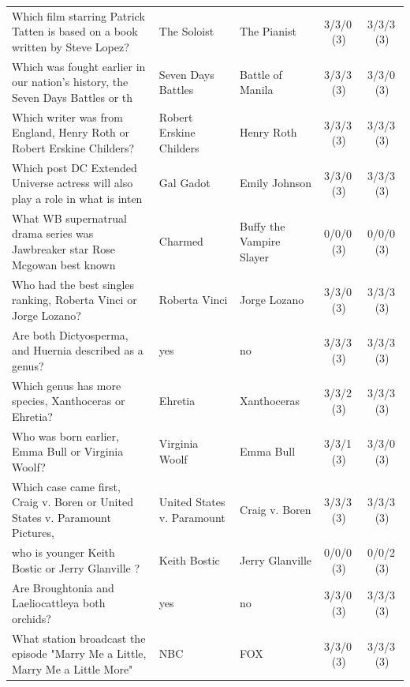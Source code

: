 \begin{longtable}{@{}p{6.6cm}p{2.9cm}p{2.9cm}cc@{}}
\rowcolor{neutralgray}
Which film starring Patrick Tatten is based on a book written by Steve Lopez? & The Soloist & The Pianist & 3/3/0\,\footnotesize(3) & 3/3/3\,\footnotesize(3) \\
Which was fought earlier in our nation's history, the Seven Days Battles or th & Seven Days Battles & Battle of Manila & 3/3/3\,\footnotesize(3) & 3/3/0\,\footnotesize(3) \\
\rowcolor{neutralgray}
Which writer was from England, Henry Roth or Robert Erskine Childers? & Robert Erskine Childers & Henry Roth & 3/3/3\,\footnotesize(3) & 3/3/3\,\footnotesize(3) \\
Which post DC Extended Universe actress will also play a role in what is inten & Gal Gadot & Emily Johnson & 3/3/0\,\footnotesize(3) & 3/3/3\,\footnotesize(3) \\
\rowcolor{neutralgray}
What WB supernatrual drama series was Jawbreaker star Rose Mcgowan best known  & Charmed & Buffy the Vampire Slayer & 0/0/0\,\footnotesize(3) & 0/0/0\,\footnotesize(3) \\
Who had the best singles ranking, Roberta Vinci or Jorge Lozano? & Roberta Vinci & Jorge Lozano & 3/3/0\,\footnotesize(3) & 3/3/3\,\footnotesize(3) \\
\rowcolor{neutralgray}
Are both Dictyosperma, and Huernia described as a genus? & yes & no & 3/3/3\,\footnotesize(3) & 3/3/3\,\footnotesize(3) \\
Which genus has more species, Xanthoceras or Ehretia? & Ehretia & Xanthoceras & 3/3/2\,\footnotesize(3) & 3/3/3\,\footnotesize(3) \\
\rowcolor{neutralgray}
Who was born earlier, Emma Bull or Virginia Woolf? & Virginia Woolf & Emma Bull & 3/3/1\,\footnotesize(3) & 3/3/0\,\footnotesize(3) \\
Which case came first, Craig v. Boren or United States v. Paramount Pictures,  & United States v. Paramount & Craig v. Boren & 3/3/3\,\footnotesize(3) & 3/3/3\,\footnotesize(3) \\
\rowcolor{neutralgray}
who is younger Keith Bostic or Jerry Glanville ? & Keith Bostic & Jerry Glanville & 0/0/0\,\footnotesize(3) & 0/0/2\,\footnotesize(3) \\
Are Broughtonia and Laeliocattleya both orchids? & yes & no & 3/3/0\,\footnotesize(3) & 3/3/3\,\footnotesize(3) \\
\rowcolor{neutralgray}
What station broadcast the episode "Marry Me a Little, Marry Me a Little More" & NBC & FOX & 3/3/0\,\footnotesize(3) & 3/3/3\,\footnotesize(3) \\

\end{longtable}
